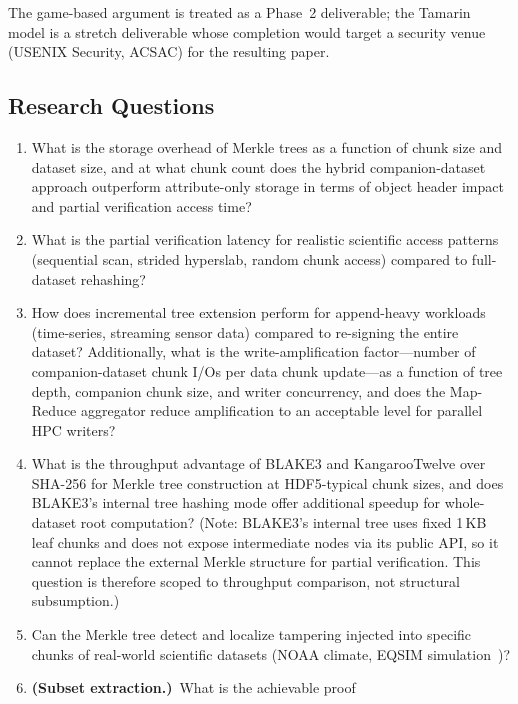 \documentclass[11pt]{article}
\begin{document}
\noindent The game-based argument is treated as a Phase~2 deliverable; the
Tamarin model is a stretch deliverable whose completion would target a
security venue (USENIX Security, ACSAC) for the resulting paper.

\subsection{Research Questions}
\label{sec:research-questions}

\begin{enumerate}[label=\textbf{RQ\arabic*}]
  \item What is the storage overhead of Merkle trees as a function of chunk
    size and dataset size, and at what chunk count does the hybrid
    companion-dataset approach outperform attribute-only storage in terms of
    object header impact and partial verification access time?
  \item What is the partial verification latency for realistic scientific
    access patterns (sequential scan, strided hyperslab, random chunk access)
    compared to full-dataset rehashing?
  \item How does incremental tree extension perform for append-heavy workloads
    (time-series, streaming sensor data) compared to re-signing the entire
    dataset?  Additionally, what is the write-amplification factor---number of
    companion-dataset chunk I/Os per data chunk update---as a function of tree
    depth, companion chunk size, and writer concurrency, and does the
    Map-Reduce aggregator reduce amplification to an acceptable level for
    parallel HPC writers?
  \item What is the throughput advantage of BLAKE3 and KangarooTwelve over
    SHA-256 for Merkle tree construction at HDF5-typical chunk sizes, and does
    BLAKE3's internal tree hashing mode offer additional speedup for
    whole-dataset root computation? (Note: BLAKE3's internal tree uses fixed
    1\,KB leaf chunks and does not expose intermediate nodes via its public
    API, so it cannot replace the external Merkle structure for partial
    verification. This question is therefore scoped to throughput comparison,
    not structural subsumption.)
  \item Can the Merkle tree detect and localize tampering injected into
    specific chunks of real-world scientific datasets (NOAA climate, EQSIM
    simulation~\cite{mccallen2021eqsim})?
  \item \textbf{(Subset extraction.)}~What is the achievable proof

\end{enumerate}
\end{document}
